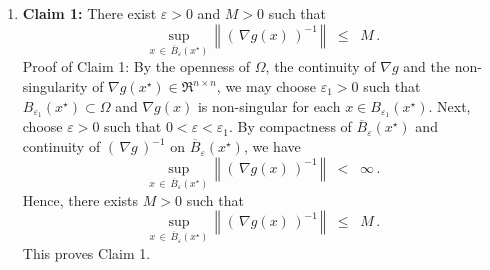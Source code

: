 \begin{enumerate}
\item
	\textbf{Claim 1:}\quad
	There exist $\varepsilon > 0$ and $M > 0$ such that
	\begin{equation*}
	\underset{x\,\in\,\overline{B}_{\varepsilon}(x^{\star})}{\sup}\,
	\left\Vert\;\left(\,\nabla g(x)\,\right)^{-1}\,\right\Vert
	\;\; \leq \;\; M\,.
	\end{equation*}
	Proof of Claim 1:\quad
	By the openness of $\Omega$, the continuity of $\nabla g$ and
	the non-singularity of $\nabla g(x^{\star}) \in \Re^{n \times n}$,
	we may choose $\varepsilon_{1} > 0$ such that
	$B_{\varepsilon_{1}}\!(x^{\star}) \subset \Omega$
	and $\nabla g(x)$ is non-singular for each $x \in B_{\varepsilon_{1}}\!(x^{\star})$.
	Next, choose $\varepsilon > 0$ such that $0 < \varepsilon < \varepsilon_{1}$.
	By compactness of $\overline{B}_{\varepsilon}(x^{\star})$ and continuity of
	$(\,\nabla g\,)^{-1}$ on $\overline{B}_{\varepsilon}(x^{\star})$, we have
	\begin{equation*}
	\underset{x\,\in\,\overline{B}_{\varepsilon}(x^{\star})}{\sup}\,
	\left\Vert\;\left(\,\nabla g(x)\,\right)^{-1}\,\right\Vert
	\;\; < \;\; \infty\,.
	\end{equation*}
	Hence, there exists $M > 0$ such that
	\begin{equation*}
	\underset{x\,\in\,\overline{B}_{\varepsilon}(x^{\star})}{\sup}\,
	\left\Vert\;\left(\,\nabla g(x)\,\right)^{-1}\,\right\Vert
	\;\; \leq \;\; M\,.
	\end{equation*}
	This proves Claim 1.
	

\end{enumerate}
